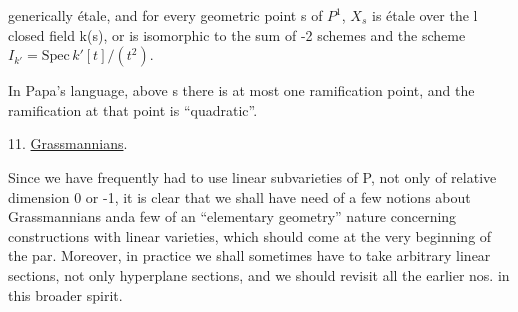 
generically étale, and for every geometric point s of $P^1$, $X_s$
is étale over the l closed field  k(s), or  is
isomorphic to the sum of -2 schemes   and  the scheme 
$I_{k'} = \mathrm{Spec}\, k'[t]/(t^2)$.

In Papa's language, above s there is at most one ramification
point, and the ramification at that point is “quadratic”.

11. \uline{Grassmannians}. 

Since we have frequently had to use linear subvarieties
of P, not only of relative dimension 0 or -1, it is clear
that we shall have need of a few notions about Grassmannians anda few
 of an “elementary geometry” nature concerning constructions
with linear varieties, which should come at the very beginning of the par.
Moreover, in practice we shall sometimes have to take arbitrary linear
sections, not only hyperplane sections, and we should
revisit all the earlier nos. in this broader spirit.

